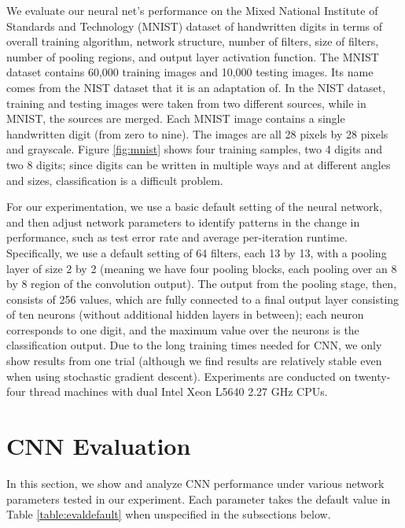 \documentclass[10pt,twocolumn]{article}
\begin{document}
We evaluate our neural net's performance on the Mixed National Institute of Standards and Technology (MNIST) dataset of handwritten digits \cite{mnist} in terms of overall training algorithm, network structure, number of filters, size of filters, number of pooling regions, and output layer activation function. The MNIST dataset contains 60,000 training images and 10,000 testing images. Its name comes from the NIST dataset that it is an adaptation of. In the NIST dataset, training and testing images were taken from two different sources, while in MNIST, the sources are merged. Each MNIST image contains a single handwritten digit (from zero to nine). The images are all 28 pixels by 28 pixels and grayscale. Figure \ref{fig:mnist} shows four training samples, two 4 digits and two 8 digits; since digits can be written in multiple ways and at different angles and sizes, classification is a difficult problem.

For our experimentation, we use a basic default setting of the neural network, and then adjust network parameters to identify patterns in the change in performance, such as test error rate and average per-iteration runtime. Specifically, we use a default setting of 64 filters, each 13 by 13, with a pooling layer of size 2 by 2 (meaning we have four pooling blocks, each pooling over an 8 by 8 region of the convolution output). The output from the pooling stage, then, consists of 256 values, which are fully connected to a final output layer consisting of ten neurons (without additional hidden layers in between); each neuron corresponds to one digit, and the maximum value over the neurons is the classification output. Due to the long training times needed for CNN, we only show results from one trial (although we find results are relatively stable even when using stochastic gradient descent). Experiments are conducted on twenty-four thread machines with dual Intel Xeon L5640 2.27 GHz CPUs.

\section{CNN Evaluation} \label{sec:evalcnn}

In this section, we show and analyze CNN performance under various network parameters tested in our experiment. Each parameter takes the default value in Table \ref{table:evaldefault} when unspecified in the subsections below.
\end{document}
